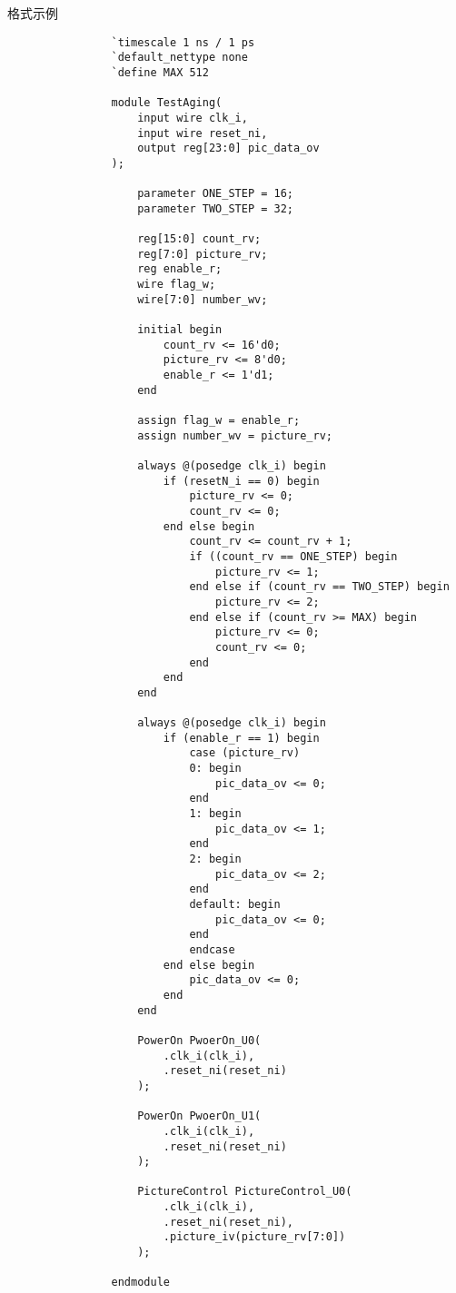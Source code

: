 \documentclass[utf-8, 10pt, a4paper, titlepage, oneside, onecolumn, openany]{ctexart} %
\begin{document}
		\begin{table}[h]
			\caption{格式示例} \label{格式示例}
		\end{table}
		
		\begin{shaded}
			\begin{verbatim}
				`timescale 1 ns / 1 ps
				`default_nettype none
				`define MAX 512
				
				module TestAging(
					input wire clk_i,
					input wire reset_ni,
					output reg[23:0] pic_data_ov
				);
				
					parameter ONE_STEP = 16;
					parameter TWO_STEP = 32;

					reg[15:0] count_rv;
					reg[7:0] picture_rv;
					reg enable_r;
					wire flag_w;
					wire[7:0] number_wv;
					
					initial begin
						count_rv <= 16'd0;
						picture_rv <= 8'd0;
						enable_r <= 1'd1;
					end
					
					assign flag_w = enable_r;
					assign number_wv = picture_rv;
					
					always @(posedge clk_i) begin
						if (resetN_i == 0) begin
							picture_rv <= 0;
							count_rv <= 0;
						end else begin
							count_rv <= count_rv + 1;
							if ((count_rv == ONE_STEP) begin
								picture_rv <= 1;
							end else if (count_rv == TWO_STEP) begin
								picture_rv <= 2;
							end else if (count_rv >= MAX) begin
								picture_rv <= 0;
								count_rv <= 0;
							end
						end
					end

					always @(posedge clk_i) begin
						if (enable_r == 1) begin
							case (picture_rv)
							0: begin
								pic_data_ov <= 0;
							end
							1: begin
								pic_data_ov <= 1;
							end
							2: begin
								pic_data_ov <= 2;
							end
							default: begin
								pic_data_ov <= 0;
							end
							endcase
						end else begin
							pic_data_ov <= 0;
						end
					end
					
					PowerOn PwoerOn_U0(
						.clk_i(clk_i),
						.reset_ni(reset_ni)
					);
					
					PowerOn PwoerOn_U1(
						.clk_i(clk_i),
						.reset_ni(reset_ni)
					);
					
					PictureControl PictureControl_U0(
						.clk_i(clk_i),
						.reset_ni(reset_ni),
						.picture_iv(picture_rv[7:0])
					);
					
				endmodule

			\end{verbatim}
		\end{shaded}
\end{document}

